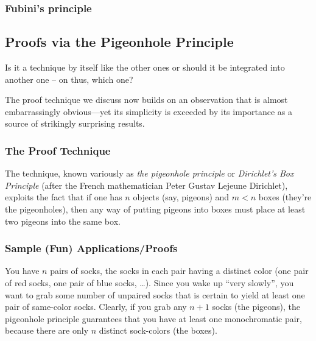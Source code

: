 \subsubsection{Fubini's principle}
\label{sec:Fubini}

\cite{Fubini}


\subsection{Proofs via the Pigeonhole Principle}
\label{sec:pigeonhole}

{\Denis Is it a technique by itself like the other ones or should it be integrated into another one -- on thus, which one?}

The proof technique we discuss now builds on an observation that is
almost embarrassingly obvious---yet its simplicity is exceeded by its
importance as a source of strikingly surprising results.

\subsubsection{The Proof Technique}

The technique, known variously as {\it the pigeonhole principle}
or {\it Dirichlet's Box Principle}
(after the French mathematician Peter Gustav Lejeune Dirichlet),
exploits the fact that if one has $n$ objects (say, pigeons) and $m <
n$ boxes (they're the pigeonholes), then any way of putting pigeons
into boxes must place at least two pigeons into the same box.


\subsubsection{Sample (Fun) Applications/Proofs}
\label{sec:pigeon-apps}

%
You have $n$ pairs of socks, the socks in each pair having a distinct
color (one pair of red socks, one pair of blue socks, \ldots).  Since
you wake up ``very slowly'', you want to grab some number of unpaired
socks that is certain to yield at least one pair of same-color socks.
Clearly, if you grab any $n+1$ socks (the pigeons), the pigeonhole
principle guarantees that you have at least one monochromatic pair,
because there are only $n$ distinct sock-colors (the boxes).

